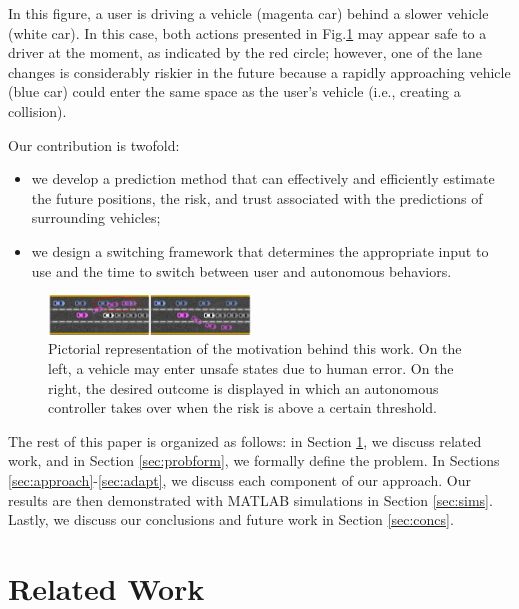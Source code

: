 \documentclass[letterpaper, 10 pt, conference]{ieeeconf}  %
\newcommand\NB[1]{$\spadesuit$\footnote{NB: #1}}
\begin{document}
In this figure, a user is driving a vehicle (magenta car) behind a slower vehicle (white car). In this case, both actions presented in Fig.\ref{fig:hiway} may appear safe to a driver at the moment, as indicated by the red circle; however, one of the lane changes is considerably riskier in the future because a rapidly approaching vehicle (blue car) could enter the same space as the user's vehicle (i.e., creating a collision). 

Our contribution is twofold:
    \begin{itemize}
    \item{we develop a prediction method that can effectively and efficiently estimate the future positions, the risk, and trust associated with the predictions of surrounding vehicles;} %
    \item{we design a switching framework that determines the appropriate input to use and the time to switch between user and autonomous behaviors.} %
    \end{itemize}


\begin{figure}[h]
    \includegraphics[width=0.48\textwidth]{fig/highway.png}
    \caption{Pictorial representation of the motivation behind this work. On the left, a vehicle may enter unsafe states due to human error. On the right, the desired outcome is displayed in which an autonomous controller takes over when the risk is above a certain threshold.}
    \label{fig:hiway}
\end{figure}

    
   The rest of this paper is organized as follows: in Section \ref{sec:relatedwork}, we discuss related work, and in Section \ref{sec:probform}, we formally define the problem. In Sections \ref{sec:approach}-\ref{sec:adapt}, we discuss each component of our approach. Our results are then demonstrated with MATLAB simulations in Section \ref{sec:sims}. Lastly, we discuss our conclusions and future work in Section \ref{sec:concs}.%


\section{Related Work} \label{sec:relatedwork}
\end{document}

